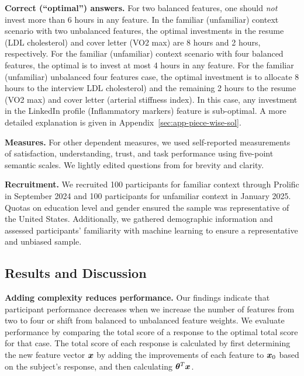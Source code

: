 \noindent\textbf{Correct (``optimal'') answers.} For two balanced features, one should \emph{not} invest more than 6 hours in any feature. In the familiar (unfamiliar) context scenario with two unbalanced features, the optimal investments in the resume (LDL cholesterol) and cover letter (VO2 max) are 8 hours and 2 hours, respectively. For the familiar (unfamiliar) context scenario with four balanced features, the optimal is to invest at most 4 hours in any feature. For the familiar (unfamiliar) unbalanced four features case, the optimal investment is to allocate 8 hours to the interview LDL cholesterol) and the remaining 2 hours to the resume (VO2 max) and cover letter (arterial stiffness index). In this case, any investment in the LinkedIn profile (Inflammatory markers) feature is sub-optimal. A more detailed explanation is given in Appendix~\ref{sec:app-piece-wise-sol}. 

\noindent\textbf{Measures.} For other dependent measures, we used self-reported measurements of satisfaction, understanding, trust, and task performance using five-point semantic scales. We lightly edited questions from \cite{mohseni2021survey} for brevity and clarity.

\noindent\textbf{Recruitment.} We recruited 100 participants for familiar context through Prolific in September 2024 and 100 participants for unfamiliar context in January 2025. Quotas on education level and gender ensured the sample was representative of the United States. Additionally, we gathered demographic information and assessed participants' familiarity with machine learning to ensure a representative and unbiased sample.


\subsection{Results and Discussion}\label{sec:user-study-results}
\textbf{Adding complexity reduces performance.} Our findings indicate that participant performance decreases when we increase the number of features from two to four or shift from balanced to unbalanced feature weights. We evaluate performance by comparing the total score of a response to the optimal total score for that case. The total score of each response is calculated by first determining the new feature vector ${\bm{x}}$ by adding the improvements of each feature to ${\bm{x}}_0$ based on the subject's response, and then calculating ${\bm{\theta}}^T{\bm{x}}$. 

